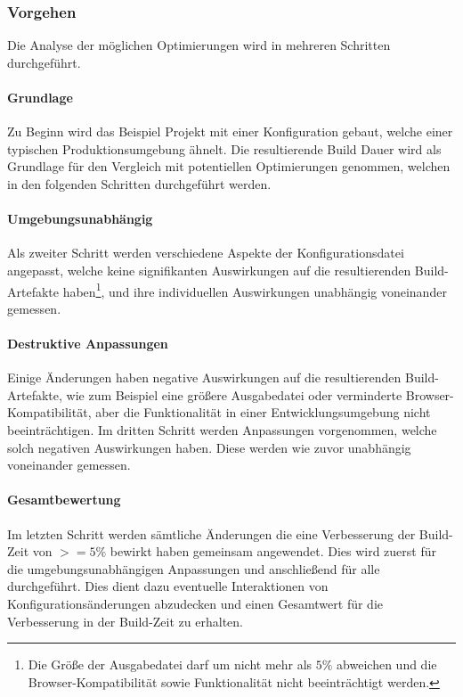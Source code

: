 \documentclass[11pt]{article}
\begin{document}
			\subsubsection{Vorgehen}
				Die Analyse der möglichen Optimierungen wird in mehreren Schritten durchgeführt.
				\paragraph{Grundlage} Zu Beginn wird das Beispiel Projekt mit einer Konfiguration gebaut, welche einer typischen Produktionsumgebung ähnelt. Die resultierende Build Dauer wird als Grundlage für den Vergleich mit potentiellen Optimierungen genommen, welchen in den folgenden Schritten durchgeführt werden.
				
				\paragraph{Umgebungsunabhängig} Als zweiter Schritt werden verschiedene Aspekte der Konfigurationsdatei angepasst, welche keine signifikanten Auswirkungen auf die resultierenden Build-Artefakte haben\footnote{Die Größe der Ausgabedatei darf um nicht mehr als $5\%$ abweichen und die Browser-Kompatibilität sowie Funktionalität nicht beeinträchtigt werden.}, und ihre individuellen Auswirkungen unabhängig voneinander gemessen.
				
				\paragraph{Destruktive Anpassungen} Einige Änderungen haben negative Auswirkungen auf die resultierenden Build-Artefakte, wie zum Beispiel eine größere Ausgabedatei oder verminderte Browser-Kompatibilität, aber die Funktionalität in einer Entwicklungsumgebung nicht beeinträchtigen. Im dritten Schritt werden Anpassungen vorgenommen, welche solch negativen Auswirkungen haben. Diese werden wie zuvor unabhängig voneinander gemessen.
				
				\paragraph{Gesamtbewertung} Im letzten Schritt werden sämtliche Änderungen die eine Verbesserung der Build-Zeit von $>=5\%$ bewirkt haben gemeinsam angewendet. Dies wird zuerst für die umgebungsunabhängigen Anpassungen und anschließend für alle durchgeführt. Dies dient dazu eventuelle Interaktionen von Konfigurationsänderungen abzudecken und einen Gesamtwert für die Verbesserung in der Build-Zeit zu erhalten.
				 
\end{document}
